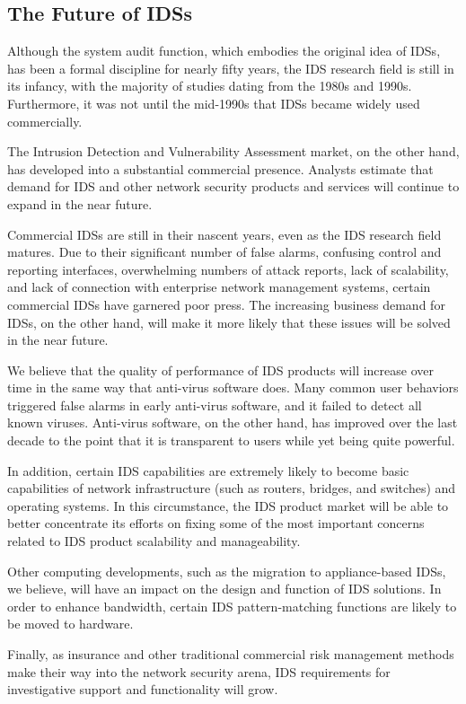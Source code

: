 \documentclass[12pt]{article}
\begin{document}
    \subsection{The Future of IDSs}
    \par Although the system audit function, which embodies the original idea of IDSs, has been a formal discipline for nearly fifty years, the IDS research field is still in its infancy, with the majority of studies dating from the 1980s and 1990s. Furthermore, it was not until the mid-1990s that IDSs became widely used commercially.
    \par The Intrusion Detection and Vulnerability Assessment market, on the other hand, has developed into a substantial commercial presence. Analysts estimate that demand for IDS and other network security products and services will continue to expand in the near future.
    \par Commercial IDSs are still in their nascent years, even as the IDS research field matures. Due to their significant number of false alarms, confusing control and reporting interfaces, overwhelming numbers of attack reports, lack of scalability, and lack of connection with enterprise network management systems, certain commercial IDSs have garnered poor press. The increasing business demand for IDSs, on the other hand, will make it more likely that these issues will be solved in the near future.
    \par We believe that the quality of performance of IDS products will increase over time in the same way that anti-virus software does. Many common user behaviors triggered false alarms in early anti-virus software, and it failed to detect all known viruses. Anti-virus software, on the other hand, has improved over the last decade to the point that it is transparent to users while yet being quite powerful.
    \par In addition, certain IDS capabilities are extremely likely to become basic capabilities of network infrastructure (such as routers, bridges, and switches) and operating systems. In this circumstance, the IDS product market will be able to better concentrate its efforts on fixing some of the most important concerns related to IDS product scalability and manageability.
    \par Other computing developments, such as the migration to appliance-based IDSs, we believe, will have an impact on the design and function of IDS solutions. In order to enhance bandwidth, certain IDS pattern-matching functions are likely to be moved to hardware.
    \par Finally, as insurance and other traditional commercial risk management methods make their way into the network security arena, IDS requirements for investigative support and functionality will grow.
    
\end{document}
